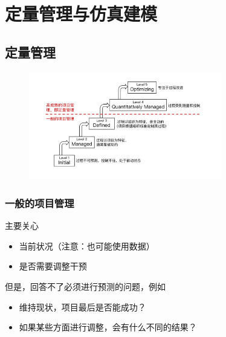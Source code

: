\section{定量管理与仿真建模}

\subsection{定量管理}
\begin{figure}[H]
    \vspace{-0.5em}
	\centering
	\includegraphics[width=0.75\textwidth]{images/高成熟度项目管理.pdf}
    \vspace{-1em}
\end{figure}

\subsubsection{一般的项目管理}
主要关心
\vspace{-0.8em}
\begin{multicols}{2}
    \begin{itemize}
        \item 当前状况（注意：也可能使用数据）
        \item 是否需要调整干预
    \end{itemize}
\end{multicols}
\vspace{-1em}

但是，回答不了必须进行预测的问题，例如
\vspace{-0.8em}
\begin{multicols}{2}
    \begin{itemize}
        \item 维持现状，项目最后是否能成功？
        \item 如果某些方面进行调整，会有什么不同的结果？
    \end{itemize}
\end{multicols}
\vspace{-1em}

